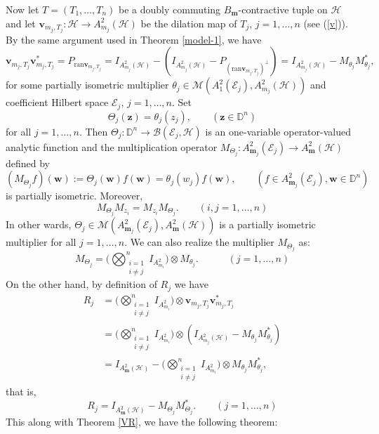 \documentclass[12pt]{amsart}
\begin{document}
Now let $T = (T_1, \ldots, T_n)$ be a doubly commuting
$B_{\bm{m}}$-contractive tuple on ${\mathcal{H}}$ and let ${\bm{v}}_{m_j, T_j} : {\mathcal{H}}
{\rightarrow} A^2_{m_j}({\mathcal{H}})$ be the dilation map of $T_j$, $j = 1, \ldots,
n$ (see (\ref{v})). By the same argument used in Theorem
\ref{model-1}, we have
\[{\bm{v}}_{m_j, T_j} {\bm{v}}_{m_j, T_j}^* = P_{\mbox{ran} {\bm{v}}_{m_j, T_j}} =
I_{A^2_{m_j}({\mathcal{H}})} - (I_{A^2_{m_j}({\mathcal{H}})} - P_{{(\mbox{ran}
{\bm{v}}_{m_j, T_j})}^{\perp}}) = I_{A^2_{m_j}({\mathcal{H}})} - M_{\theta_j}
M_{\theta_j}^*,\]for some partially isometric multiplier $\theta_j
\in {\mathcal{M}}(A^2_1({\mathcal{E}}_j), A^2_{m_j}({\mathcal{H}}))$ and coefficient Hilbert
space ${\mathcal{E}}_j$, $j = 1, \ldots, n$. Set
\begin{equation}\label{theta}\Theta_j({\bm{z}}) = \theta_j(z_j), \quad
\quad ({\bm{z}} \in {\mathbb{D}}^n)\end{equation}for all $j = 1, \ldots, n$. Then
$\Theta_j : {\mathbb{D}}^n {\rightarrow} {\mathcal{B}}({\mathcal{E}}_j, {\mathcal{H}})$ is an one-variable
operator-valued analytic function and the multiplication operator
$M_{\Theta_j} : A^2_{{\bm{m}}_j}({\mathcal{E}}_j) {\rightarrow} A^2_{\bm{m}}({\mathcal{H}})$ defined by
\[(M_{\Theta_j} f)({\bm{w}}) := \Theta_j({\bm{w}}) f({\bm{w}}) = \theta_j(w_j) f({\bm{w}}),
\quad \quad (f \in A^2_{{\bm{m}}_j}({\mathcal{E}}_j), {\bm{w}} \in {\mathbb{D}}^n)\]is partially
isometric. Moreover,
\[M_{\Theta_j} M_{z_i} = M_{z_i} M_{\Theta_j}. \quad \quad (i, j = 1,
\ldots, n)\]In other wards, $\Theta_j \in {\mathcal{M}}(A^2_{{\bm{m}}_j}({\mathcal{E}}_j),
A^2_{\bm{m}}({\mathcal{H}}))$ is a partially isometric multiplier for all $j = 1,
\ldots, n$. We can also realize the multiplier $M_{\Theta_j}$ as:
\[M_{\Theta_j} = \Big(\bigotimes_{\substack{{i=1}\\i \neq j}}^n
I_{A^2_{m_i}}\Big) \otimes M_{\theta_j}.\quad \quad \quad (j = 1,
\ldots, n)\]On the other hand, by definition of $R_j$ we have
\[\begin{split}R_j & = \Big(\bigotimes_{\substack{{i=1}\\i \neq j}}^n
I_{A^2_{m_i}}\Big) \otimes {\bm{v}}_{m_j, T_j} {\bm{v}}_{m_j, T_j}^*\\
& = \Big(\bigotimes_{\substack{{i=1}\\i \neq j}}^n
I_{A^2_{m_i}}\Big) \otimes (I_{A^2_{m_j}({\mathcal{H}})} - M_{\theta_j}
M_{\theta_j}^*)\\& = I_{A^2_{\bm{m}}({\mathcal{H}})} -
\Big(\bigotimes_{\substack{{i=1}\\i \neq j}}^n I_{A^2_{m_i}}\Big)
\otimes M_{\theta_j} M_{\theta_j}^* ,\end{split}\]that is, \[R_j =
I_{A^2_{\bm{m}}({\mathcal{H}})} - M_{\Theta_j} M_{\Theta_j}^*. \quad \quad (j =
1, \ldots, n)\] This along with Theorem \ref{VR}, we have the
following theorem:
\end{document}
